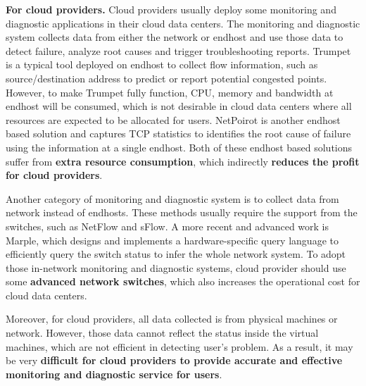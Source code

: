 \documentclass[11px]{article}
\begin{document}
\textbf{For cloud providers.} Cloud providers usually deploy some monitoring and diagnostic applications in their cloud data centers. The monitoring and diagnostic system collects data from either the network or endhost and use those data to detect failure, analyze root causes and trigger troubleshooting reports. Trumpet\cite{sigcomm/trumpet} is a typical tool deployed on endhost to collect flow information, such as source/destination address to predict or report potential congested points. However, to make Trumpet fully function, CPU, memory and bandwidth at endhost will be consumed, which is not desirable in cloud data centers where all resources are expected to be allocated for users. NetPoirot\cite{sigcomm/netpoirot} is another endhost based solution and captures TCP statistics to identifies the root cause of failure using the information at a single endhost. Both of these endhost based solutions suffer from \textbf{extra resource consumption}, which indirectly \textbf{reduces the profit for cloud providers}.

Another category of monitoring and diagnostic system is to collect data from network instead of endhosts. These methods usually require the support from the switches, such as NetFlow\cite{url/netflow} and sFlow\cite{url/sflow}. A more recent and advanced work is Marple\cite{sigcomm/marple}, which designs and implements a hardware-specific query language to efficiently query the switch status to infer the whole network system. To adopt those in-network monitoring and diagnostic systems, cloud provider should use some \textbf{advanced network switches}, which also increases the operational cost for cloud data centers.

Moreover, for cloud providers, all data collected is from physical machines or network. However, those data cannot reflect the status inside the virtual machines, which are not efficient in detecting user's problem. As a result, it may be very \textbf{difficult for cloud providers to provide accurate and effective monitoring and diagnostic service for users}.
\end{document}
